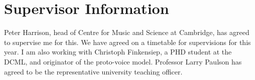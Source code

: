 \documentclass{article}
\begin{document}
\section{Supervisor Information} 
Peter Harrison, head of Centre for Music and Science at Cambridge, has agreed to supervise me for this. 
We have agreed on a timetable for supervisions for this year. I am also working with Christoph Finkensiep, a PHD student at the DCML, and originator of the proto-voice model.
Professor Larry Paulson has agreed to be the representative university teaching officer.

% 
% 
\end{document}
